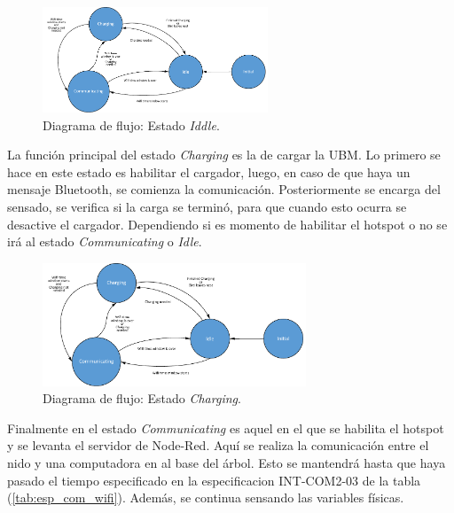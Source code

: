 \begin{figure}[H]
	\centering
	\includegraphics[width=0.6\textwidth, page=4]{ImagenesIngenieria de Detalle/FlowChart.pdf}	
	\caption{Diagrama de flujo: Estado \textit{Iddle}.}
	\label{fig:Diagrama_de_flujo_idle}
\end{figure}

La función principal del estado \textit{Charging} es la de cargar la UBM. Lo primero se hace en este estado es habilitar el cargador, luego, en caso de que haya un mensaje Bluetooth, se comienza la comunicación. Posteriormente se encarga del sensado, se verifica si la carga se terminó, para que cuando esto ocurra se desactive el cargador. Dependiendo si es momento de habilitar el hotspot o no se irá al estado \textit{Communicating} o \textit{Idle}.

\begin{figure}[H]
	\centering
	\includegraphics[width=0.7\textwidth, page=2]{ImagenesIngenieria de Detalle/FlowChart.pdf}
	\caption{Diagrama de flujo: Estado \textit{Charging}.}
	\label{fig:Diagrama_de_flujo_charging}
\end{figure}

Finalmente en el estado \textit{Communicating} es aquel en el que se habilita el hotspot y se levanta el servidor de Node-Red. Aquí se realiza la comunicación entre el nido y una computadora en al base del árbol. Esto se mantendrá hasta que haya pasado el tiempo especificado en la especificacion INT-COM2-03 de la tabla (\ref{tab:esp_com_wifi}). Además, se continua sensando las variables físicas.

